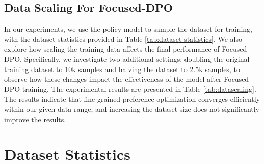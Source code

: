 \subsection{Data Scaling For Focused-DPO}

In our experiments, we use the policy model to sample the dataset for training, with the dataset statistics provided in Table \ref{tab:dataset-statistics}. We also explore how scaling the training data affects the final performance of Focused-DPO. Specifically, we investigate two additional settings: doubling the original training dataset to 10k samples and halving the dataset to 2.5k samples, to observe how these changes impact the effectiveness of the model after Focused-DPO training. 
The experimental results are presented in Table \ref{tab:datascaling}. The results indicate that fine-grained preference optimization converges efficiently within our given data range, and increasing the dataset size does not significantly improve the results.

\begin{table}[h!]
    \centering
    \caption{Dataset Scaling for Focused-DPO based on \textit{Qwen2.5-Coder-Instruct-7B}}
    \label{tab:datascaling}
\end{table}


\section{Dataset Statistics}

